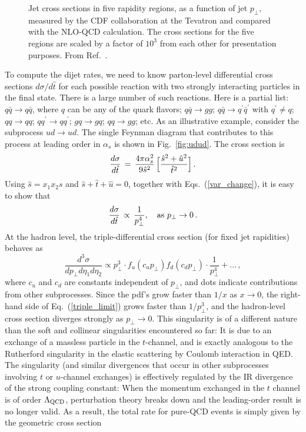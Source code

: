 \documentclass{ws-procs9x6}
\def\beq{\begin{equation}}
\def\eeq#1{\label{#1}\end{equation}}
\def\leqn#1{(\ref{#1})}
\begin{document}
\begin{figure}
\begin{center}
\end{center}
\caption{Jet cross sections in five rapidity regions, as a function of jet $p_\perp$, measured by the CDF collaboration at the Tevatron and compared with the NLO-QCD calculation. The cross sections for the five regions are scaled by a factor of $10^3$ from each other for presentation purposes. From Ref.~\cite{CDF_dijet}.}
\label{fig:CDF_dijet}
\end{figure}

To compute the dijet rates, we need to know parton-level differential cross sections $d\sigma/d\hat{t}$ for each possible reaction with two strongly interacting particles in the final state. There is a large number of such reactions. Here is a partial list: $q\bar{q}\to q\bar{q}$, where $q$ can be any of the quark flavors; $q\bar{q}\to gg$; $q\bar{q}\to q^\prime\bar{q}^\prime$ with $q^\prime\not=q$; $qq\to qq$; $qq^\prime\to qq^\prime$; $gq\to gq$; $qq\to gg$; etc. As an illustrative example, consider the subprocess $ud\to ud$. The single Feynman diagram that contributes to this process at leading order in $\alpha_s$ is shown in Fig.~\ref{fig:udud}. The cross section is
\beq
\frac{d\sigma}{d\hat{t}} \,=\, \frac{4\pi \alpha_s^2}{9\hat{s}^2} \,\Bigl[ \frac{\hat{s}^2+\hat{u}^2}{\hat{t}^2} \Bigr]\,.
\eeq{udud_xsec}
Using $\hat{s}=x_1x_2s$ and $\hat{s}+\hat{t}+\hat{u}=0$, together with Eqs.~\leqn{var_change}, it is easy to show that 
\beq
\frac{d\sigma}{d\hat{t}}\,\propto\, \frac{1}{p_\perp^4},~~~{\rm as}~p_\perp\to 0\,.
\eeq{udud_limit} 
At the hadron level, the triple-differential cross section (for fixed jet rapidities) behaves as
\beq
\frac{d^3\sigma}{dp_\perp d\eta_1 d\eta_2} \propto p_\perp^3 \cdot f_u (c_up_\perp) f_d(c_d p_\perp) \cdot \frac{1}{p_\perp^4}+ \ldots\,,
\eeq{triple_limit}
where $c_u$ and $c_d$ are constants independent of $p_\perp$, and dots indicate contributions from other subprocesses. Since the pdf's grow faster than $1/x$ as $x\to 0$, the right-hand side of Eq.~\leqn{triple_limit} grows faster than $1/p_\perp^3$, and the hadron-level cross section diverges strongly as $p_\perp\to 0$. This singularity is of a different nature than the soft and collinear singularities encountered so far: It is due to an exchange of a massless particle in the $t$-channel, and is exactly analogous to the Rutherford singularity in the elastic scattering by Coulomb interaction in QED. The singularity (and similar divergences that occur in other subprocesses involving $t$ or $u$-channel exchanges) is effectively regulated by the IR divergence of the strong coupling constant: When the momentum exchanged in the $t$ channel is of order $\Lambda_{\rm QCD}$, perturbation theory breaks down and the leading-order result is no longer valid. As a result, the total rate for pure-QCD events is simply given by the geometric cross section 
\end{document}
